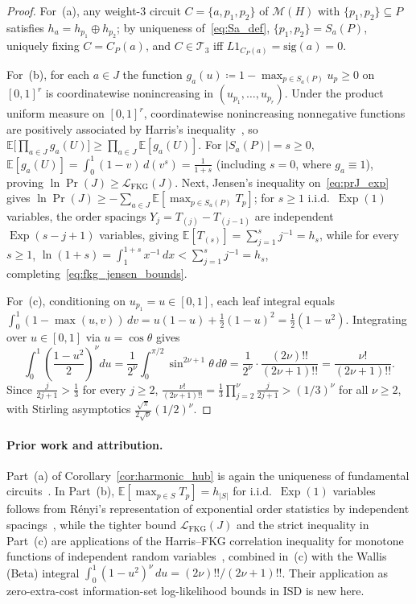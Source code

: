 \documentclass[12pt]{article}
\theoremstyle{definition}
\newcommand{\E}{\mathbb{E}}
\DeclareMathOperator{\Exp}{Exp}
\newcommand{\Tc}{\mathcal{T}_3}
\newcommand{\LFKG}{\mathcal{L}_{\mathrm{FKG}}}
\begin{document}
\begin{proof}
For~(a), any weight-3 circuit $C = \{a, p_1, p_2\}$ of $\mathcal{M}(H)$ with $\{p_1, p_2\} \subseteq P$ satisfies
$h_a = h_{p_1} \oplus h_{p_2}$; by uniqueness of~\eqref{eq:Sa_def}, $\{p_1, p_2\} = S_a(P)$, uniquely fixing $C =
C_P(a)$, and $C \in \Tc$ iff $L 1_{C_P(a)} = \mathrm{sig}(a) = 0$.

For~(b), for each $a \in J$ the function $g_a(u) \coloneqq 1 - \max_{p \in S_a(P)} u_p \ge 0$ on $[0, 1]^r$ is
coordinatewise nonincreasing in $(u_{p_1}, \dots, u_{p_r})$. Under the product uniform measure on $[0, 1]^r$,
coordinatewise nonincreasing nonnegative functions are positively associated by Harris's inequality~\cite{Harris1960,
EsaryProschanWalkup1967,FortuinKasteleynGinibre1971}, so $\E\bigl[\prod_{a \in J} g_a(U)\bigr] \ge \prod_{a \in J}
\E[g_a(U)]$. For $|S_a(P)| = s \ge 0$, $\E[g_a(U)] = \int_0^1 (1 - v)\,d(v^s) = \frac{1}{1 + s}$ (including $s =
0$, where $g_a \equiv 1$), proving $\ln \Pr(J) \ge \LFKG(J)$. Next, Jensen's inequality on~\eqref{eq:prJ_exp} gives
$\ln \Pr(J) \ge -\sum_{a \in J} \E[\max_{p \in S_a(P)} T_p]$; for $s \ge 1$ i.i.d.\ $\Exp(1)$ variables, the order
spacings $Y_j = T_{(j)} - T_{(j-1)}$ are independent $\Exp(s - j + 1)$ variables, giving $\E[T_{(s)}] = \sum_{j=1}^s
j^{-1} = h_s$, while for every $s \ge 1$, $\ln(1 + s) = \int_1^{1+s} x^{-1}\,dx < \sum_{j=1}^s j^{-1} = h_s$,
completing~\eqref{eq:fkg_jensen_bounds}.

For~(c), conditioning on $u_{p_1} = u \in [0, 1]$, each leaf integral equals $\int_0^1 (1 - \max(u, v))\,dv = u(1 -
u) + \frac{1}{2}(1 - u)^2 = \frac{1}{2}(1 - u^2)$. Integrating over $u \in [0, 1]$ via $u = \cos\theta$ gives
\[
  \int_0^1 \left(\frac{1 - u^2}{2}\right)^\nu du
  = \frac{1}{2^\nu} \int_0^{\pi/2} \sin^{2\nu+1}\theta\,d\theta
  = \frac{1}{2^\nu} \cdot \frac{(2\nu)!!}{(2\nu + 1)!!}
  = \frac{\nu!}{(2\nu + 1)!!}.
\]
Since $\frac{j}{2j+1} > \frac{1}{3}$ for every $j \ge 2$, $\frac{\nu!}{(2\nu+1)!!} = \frac{1}{3}\prod_{j=2}^\nu
\frac{j}{2j+1} > (1/3)^\nu$ for all $\nu \ge 2$, with Stirling asymptotics
$\frac{\sqrt{\pi}}{2\sqrt{\nu}}(1/2)^\nu$.
\end{proof}

\paragraph{Prior work and attribution.}
Part~(a) of Corollary~\ref{cor:harmonic_hub} is again the uniqueness of fundamental
circuits~\cite[Cor.~1.2.6]{Oxley2011}. In Part~(b), $\E[\max_{p \in S} T_p] = h_{|S|}$ for i.i.d.\ $\Exp(1)$
variables follows from R\'enyi's representation of exponential order statistics by independent
spacings~\cite{Renyi1953}, while the tighter bound $\LFKG(J)$ and the strict inequality in Part~(c) are applications
of the Harris--FKG correlation inequality for monotone functions of independent random
variables~\cite{Harris1960,EsaryProschanWalkup1967,FortuinKasteleynGinibre1971}, combined in~(c) with the Wallis
(Beta) integral $\int_0^1 (1 - u^2)^\nu\,du = (2\nu)!!/(2\nu + 1)!!$. Their application as zero-extra-cost
information-set log-likelihood bounds in ISD is new here.
\end{document}
